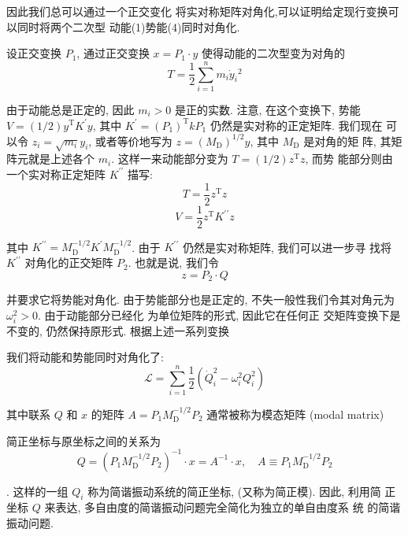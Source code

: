 \documentclass[11pt, a4paper, oneside]{ctexart}
\begin{document}
{因此我们总可以通过一个正交变化
将实对称矩阵对角化,可以证明给定现行变换可以同时将两个二次型
动能(1)势能(4)同时对角化.

设正交变换 $P_{1}$, 通过正交变换 $x=P_{1} \cdot y$ 使得动能的二次型变为对角的
\begin{equation}
T=\frac{1}{2} \sum_{i=1}^{n} m_{i} \dot{y}_{i}{ }^{2}
\end{equation}

由于动能总是正定的, 因此 $m_{i}>0$ 是正的实数. 注意, 在这个变换下, 势能 $V=(1 / 2) y^{\mathrm{T}} K^{\prime} y$, 其中 $K^{\prime}=\left(P_{1}\right)^{\mathrm{T}} k P_{1}$ 仍然是实对称的正定矩阵. 我们现在 可以令 $z_{i}=\sqrt{m_{i}} y_{i}$, 或者等价地写为 $z=\left(M_{\mathrm{D}}\right)^{1 / 2} y$, 其中 $M_{\mathrm{D}}$ 是对角的矩 阵, 其矩阵元就是上述各个 $m_{i}$. 这样一来动能部分变为 $T=(1 / 2) z^{\mathrm{T}} z$, 而势 能部分则由一个实对称正定矩阵 $K^{\prime \prime}$ 描写:
\begin{equation}
    T=\frac{1}{2} z^{\mathrm{T}} z
\end{equation}
\begin{equation}
    V=\frac{1}{2} z^{\mathrm{T}} K^{\prime \prime} z
\end{equation}


其中 $K^{\prime \prime}=M_{\mathrm{D}}^{-1 / 2} K^{\prime} M_{\mathrm{D}}^{-1 / 2}$. 由于 $K^{\prime \prime}$ 仍然是实对称矩阵, 我们可以进一步寻 找将 $K^{\prime \prime}$ 对角化的正交矩阵 $P_{2}$. 也就是说, 我们令
$$
z=P_{2} \cdot Q
$$


并要求它将势能对角化. 由于势能部分也是正定的, 
不失一般性我们令其对角元为 
$\omega_{i}^{2}>0$. 由于动能部分已经化
为单位矩阵的形式, 因此它在任何正 交矩阵变换下是
不变的, 仍然保持原形式. 根据上述一系列变换

我们将动能和势能同时对角化了:
\begin{equation}
    \mathscr{L}=\sum_{i=1}^{n} \frac{1}{2}\left(\dot{Q}_{i}^{2}-\omega_{i}^{2} Q_{i}^{2}\right)
\end{equation}


其中联系 $Q$ 和 $x$ 的矩阵 $A=P_{1} M_{\mathrm{D}}^{-1 / 2} P_{2}$ 通常被称为模态矩阵 (modal matrix)

简正坐标与原坐标之间的关系为
$$
Q=\left(P_{1} M_{\mathrm{D}}^{-1 / 2} P_{2}\right)^{-1} \cdot x=A^{-1} \cdot x, \quad A \equiv P_{1} M_{\mathrm{D}}^{-1 / 2} P_{2}
$$

.
 这样的一组 $Q_{i}$ 称为简谐振动系统的简正坐标, 
 (又称为简正模). 因此, 利用简 正坐标 $Q$ 来表达, 
 多自由度的简谐振动问题完全简化为独立的单自由度系
 统 的简谐振动问题. 



}
\end{document}
